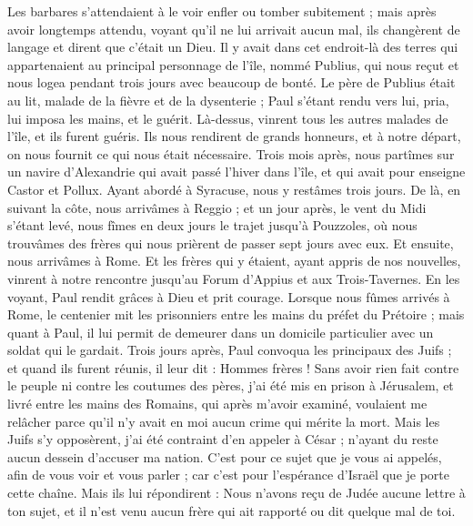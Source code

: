 \begin{multicols}{2}
Les barbares s’attendaient à le voir enfler ou tomber subitement ; mais après avoir longtemps attendu, voyant qu’il ne lui arrivait aucun mal, ils changèrent de langage et dirent que c’était un Dieu.
Il y avait dans cet endroit-là des terres qui appartenaient au principal personnage de l'île, nommé Publius, qui nous reçut et nous logea pendant trois jours avec beaucoup de bonté.
Le père de Publius était au lit, malade de la fièvre et de la dysenterie ; Paul s’étant rendu vers lui, pria, lui imposa les mains, et le guérit.
Là-dessus, vinrent tous les autres malades de l'île, et ils furent guéris.
Ils nous rendirent de grands honneurs, et à notre départ, on nous fournit ce qui nous était nécessaire.
Trois mois après, nous partîmes sur un navire d'Alexandrie qui avait passé l’hiver dans l'île, et qui avait pour enseigne Castor et Pollux.
Ayant abordé à Syracuse, nous y restâmes trois jours.
De là, en suivant la côte, nous arrivâmes à Reggio ; et un jour après, le vent du Midi s'étant levé, nous fîmes en deux jours le trajet jusqu’à Pouzzoles,
où nous trouvâmes des frères qui nous prièrent de passer sept jours avec eux. Et ensuite, nous arrivâmes à Rome.
Et les frères qui y étaient, ayant appris de nos nouvelles, vinrent à notre rencontre jusqu’au Forum d'Appius et aux Trois-Tavernes. En les voyant, Paul rendit grâces à Dieu et prit courage.
Lorsque nous fûmes arrivés à Rome, le centenier mit les prisonniers entre les mains du préfet du Prétoire ; mais quant à Paul, il lui permit de demeurer dans un domicile particulier avec un soldat qui le gardait.
Trois jours après, Paul convoqua les principaux des Juifs ; et quand ils furent réunis, il leur dit : Hommes frères ! Sans avoir rien fait contre le peuple ni contre les coutumes des pères, j'ai été mis en prison à Jérusalem, et livré entre les mains des Romains,
qui après m'avoir examiné, voulaient me relâcher parce qu'il n'y avait en moi aucun crime qui mérite la mort.
Mais les Juifs s'y opposèrent, j'ai été contraint d'en appeler à César ; n’ayant du reste aucun dessein d'accuser ma nation.
C’est pour ce sujet que je vous ai appelés, afin de vous voir et vous parler ; car c'est pour l'espérance d'Israël que je porte cette chaîne.
Mais ils lui répondirent : Nous n'avons reçu de Judée aucune lettre à ton sujet, et il n’est venu aucun frère qui ait rapporté ou dit quelque mal de toi.

\end{multicols}
